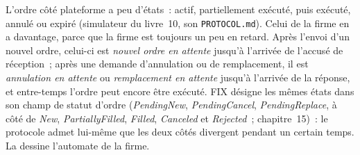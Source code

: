 L'ordre côté plateforme a peu d'états~: actif, partiellement exécuté, puis exécuté, annulé ou expiré (simulateur du livre~10, son
\texttt{PROTOCOL.md}). Celui de la firme en a davantage, parce que la firme est toujours un peu en retard. Après l'envoi d'un nouvel ordre, celui-ci est
\emph{nouvel ordre en attente} jusqu'à l'arrivée de l'accusé de réception~; après une demande d'annulation ou de remplacement, il est \emph{annulation en attente} ou
\emph{remplacement en attente} jusqu'à l'arrivée de la réponse, et entre-temps l'ordre peut encore être exécuté. FIX désigne les mêmes états dans son
champ de statut d'ordre (\emph{PendingNew}, \emph{PendingCancel}, \emph{PendingReplace}, à côté de \emph{New}, \emph{PartiallyFilled},
\emph{Filled}, \emph{Canceled} et \emph{Rejected}~; chapitre~15)~: le protocole admet lui-même que les deux côtés divergent pendant un
certain temps. La  dessine l'automate de la firme.

